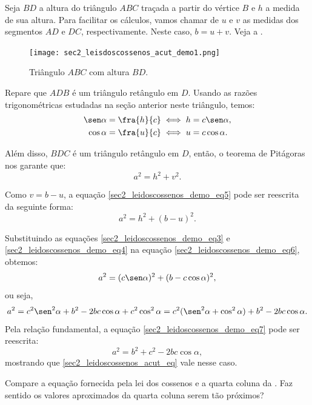 Seja $BD$ a altura do triângulo $ABC$ traçada a partir do vértice $B$ e $h$ a medida de sua altura. Para facilitar os cálculos, vamos chamar de $u$ e $v$ as medidas dos segmentos $AD$ e $DC$, respectivamente. Neste caso, $b=u+v$. Veja a .

\begin{figure}[H]
    \centering
    \texttt{[image: sec2\_leisdoscossenos\_acut\_demo1.png]}
    \caption{Triângulo $ABC$ com altura $BD$.}
    \label{sec2_leidoscossenos_acut_demo1_fig}
\end{figure}

Repare que $ADB$ é um triângulo retângulo em $D$. Usando as razões trigonométricas estudadas na seção anterior neste triângulo, temos:
\begin{eqnarray}{}
 \sen\alpha = \fra{h}{c} & \iff h=c\sen\alpha, \label{sec2_leidoscossenos_demo_eq3}\\ 
 \cos\alpha = \fra{u}{c} & \iff u=c\cos\alpha. \label{sec2_leidoscossenos_demo_eq4}
\end{eqnarray}

Além disso, $BDC$ é um triângulo retângulo em $D$, então, o teorema de Pitágoras nos garante que:
\begin{equation}
    a^2=h^2+v^2. \label{sec2_leidoscossenos_demo_eq5}
\end{equation}

Como $v=b-u$, a equação \eqref{sec2_leidoscossenos_demo_eq5} pode ser reescrita da seguinte forma:
\begin{equation}
    a^2=h^2+(b-u)^2. \label{sec2_leidoscossenos_demo_eq6}
\end{equation}

Substituindo as equações \eqref{sec2_leidoscossenos_demo_eq3} e \eqref{sec2_leidoscossenos_demo_eq4} na equação \eqref{sec2_leidoscossenos_demo_eq6}, obtemos:
$$a^2=(c\sen\alpha)^2+(b-c\cos\alpha)^2,$$
ou seja,
\begin{equation}\label{sec2_leidoscossenos_demo_eq7}
    a^2=c^2\sen^2\alpha+b^2-2bc\cos\alpha+c^2\cos^2\alpha = c^2(\sen^2\alpha+\cos^2\alpha)+b^2-2bc\cos\alpha.
\end{equation}
Pela relação fundamental, a equação \eqref{sec2_leidoscossenos_demo_eq7} pode ser reescrita:
$$a^2=b^2+c^2-2bc\cos\alpha,$$
\noindent mostrando que \eqref{sec2_leidoscossenos_acut_eq} vale nesse caso.


\begin{reflection}
Compare a equação fornecida pela lei dos cossenos e a quarta coluna da . Faz sentido os valores aproximados da quarta coluna serem tão próximos?
\end{reflection}

